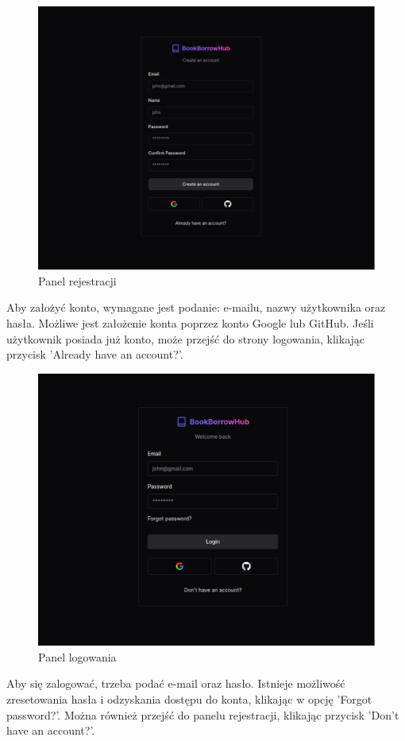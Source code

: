 \documentclass[12pt]{article}
\begin{document}
\newpage
\begin{figure}[h!]
	\centering
	\includegraphics[width=17.5cm]{figures/Obraz9.png}
	\caption{Panel rejestracji}
\end{figure}
Aby założyć konto, wymagane jest podanie: e-mailu, 
nazwy użytkownika oraz hasła. 
Możliwe jest założenie konta poprzez 
konto Google lub GitHub. 
Jeśli użytkownik posiada już konto, 
może przejść do strony logowania, 
klikając przycisk 'Already have an account?'.

\newpage
\begin{figure}[h!]
	\centering
	\includegraphics[width=17.5cm]{figures/Obraz10.png}
	\caption{Panel logowania}
\end{figure}
Aby się zalogować, trzeba podać e-mail oraz hasło. 
Istnieje możliwość zresetowania hasła i 
odzyskania dostępu do konta, klikając w opcję 
'Forgot password?'. Można również przejść do panelu rejestracji, 
klikając przycisk 'Don't have an account?'.
\end{document}
